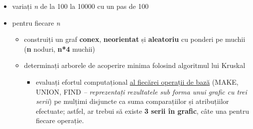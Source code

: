 \documentclass[../ro-fa-lab.tex]{subfiles}
\begin{document}
\begin{itemize}
\item
  variați \emph{n} de la 100 la 10000 cu un pas de 100
\item
  pentru fiecare \emph{n}

  \begin{itemize}
  \item
    construiți un graf \textbf{conex}, \textbf{neorientat} și
    \textbf{aleatoriu} cu ponderi pe muchii (\textbf{n} noduri,
    \textbf{n*4} muchii)
  \item
    determinați arborele de acoperire minima folosind algoritmul lui
    Kruskal

    \begin{itemize}
    \item
      evaluați efortul computațional \ul{al fiecărei operații de bază}
      (MAKE, UNION, FIND \emph{-- reprezentați rezultatele sub forma
      unui grafic cu trei serii}) pe mulțimi disjuncte ca suma
      comparațiilor și atribuțiilor efectuate; astfel, ar trebui să
      existe \textbf{3 serii în grafic}, câte una pentru fiecare
      operație.
    \end{itemize}
  \end{itemize}
\end{itemize}
\end{document}
